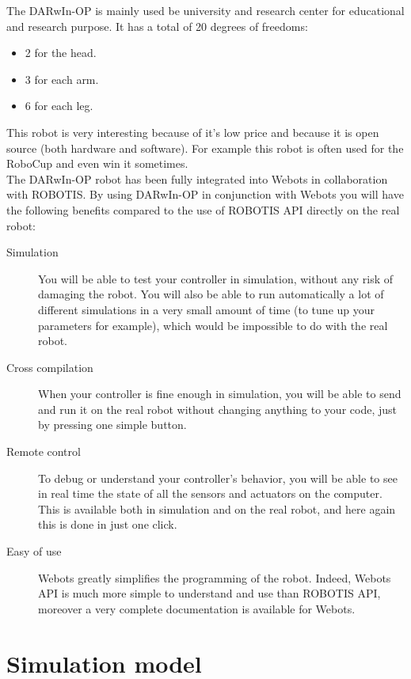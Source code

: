 \documentclass[a4paper, 12pt]{article}  		%
\begin{document}
The DARwIn-OP is mainly used be university and research center for educational and research purpose. It has a total of 20 degrees of freedoms:
\begin{itemize}
\item 2 for the head.
\item 3 for each arm.
\item 6 for each leg.
\end{itemize}

This robot is very interesting because of it's low price and because it is open source (both hardware and software). For example this robot is often used for the RoboCup and even win it sometimes.\\

The DARwIn-OP robot has been fully integrated into Webots in collaboration with ROBOTIS. By using DARwIn-OP in conjunction with Webots you will have the following benefits compared to the use of ROBOTIS API directly on the real robot:
\begin{description}
\item[Simulation ] You will be able to test your controller in simulation, without any risk of damaging the robot. You will also be able to run automatically a lot of different simulations in a very small amount of time (to tune up your parameters for example), which would be impossible to do with the real robot.
\item[Cross compilation ] When your controller is fine enough in simulation, you will be able to send and run it on the real robot without changing anything to your code, just by pressing one simple button.
\item[Remote control ] To debug or understand your controller's behavior, you will be able to see in real time the state of all the sensors and actuators on the computer. This is available both in simulation and on the real robot, and here again this is done in just one click.
\item[Easy of use ] Webots greatly simplifies the programming of the robot. Indeed, Webots API is much more simple to understand and use than ROBOTIS API, moreover a very complete documentation is available for Webots.
\end{description}


\newpage
\section{Simulation model}
\end{document}
